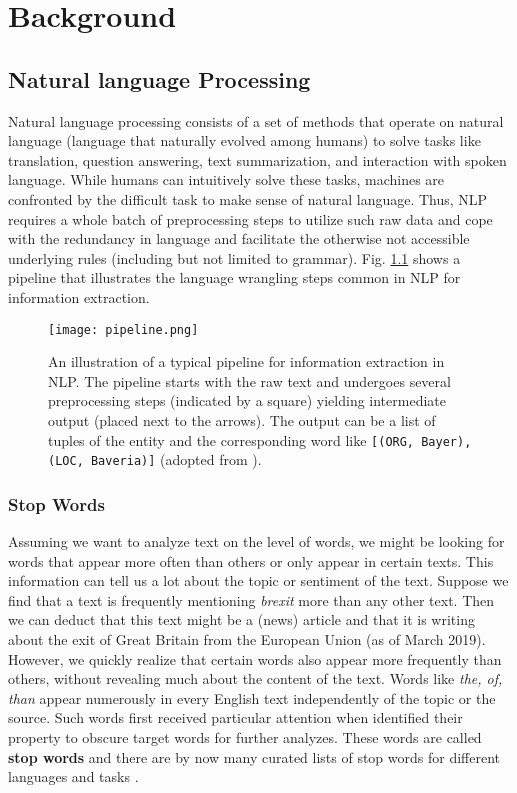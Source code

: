 \chapter{Background}

\section{Natural language Processing}
  Natural language processing consists of a set of methods that operate on natural language (language that naturally evolved among humans) to solve tasks like translation, question answering, text summarization, and interaction with spoken language.
  While humans can intuitively solve these tasks, machines are confronted by the difficult task to make sense of natural language.
  Thus, NLP requires a whole batch of preprocessing steps to utilize such raw data and cope with the redundancy in language and facilitate the otherwise not accessible underlying rules (including but not limited to grammar).
  Fig. \ref{fig:pipeline} shows a pipeline that illustrates the language wrangling steps common in NLP for information extraction.

\begin{figure}[h!]
  \centering
  \texttt{[image: pipeline.png]}
  \caption{An illustration of a typical pipeline for information extraction in NLP. The pipeline starts with the raw text and undergoes several preprocessing steps (indicated by a square) yielding intermediate output (placed next to the arrows). The output can be a list of tuples of the entity and the corresponding word like \texttt{[(ORG, \textquotesingle Bayer\textquotesingle), (LOC, \textquotesingle Baveria\textquotesingle)]} (adopted from \citep{Bird2009}).}
\label{fig:pipeline}
\end{figure}

\subsection{Stop Words}
  Assuming we want to analyze text on the level of words, we might be looking for
  words that appear more often than others or only appear in certain texts.
  This information can tell us a lot about the topic or sentiment of the text.
  Suppose we find that a text is frequently mentioning \textit{brexit} more than any other text.
  Then we can deduct that this text might be a (news) article and that it is writing about the exit of Great Britain from the European Union (as of March 2019).
  However, we quickly realize that certain words also appear more frequently than others, without revealing much about the content of the text.
  Words like \textit{the, of, than} appear numerously in every English text independently of the topic or the source.
  Such words first received particular attention when \cite{Luhn1960}  identified their property to obscure target words for further analyzes.
  These words are called \textbf{stop words} and there are by now many curated lists of stop words for different languages and tasks \citep{RANKS2019}.

